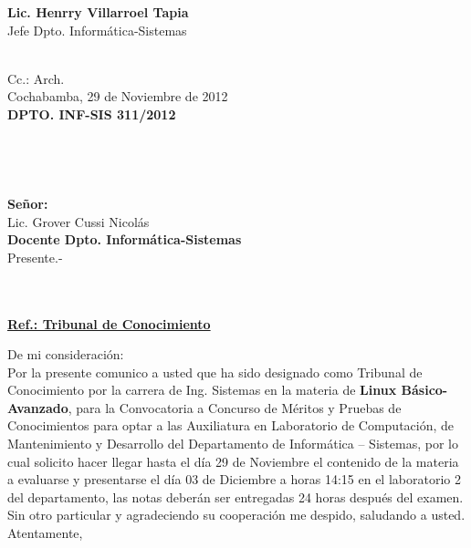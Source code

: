 \documentclass[letterpaper,11pt]{letter}
\begin{document}
\vspace{3.5cm}
\begin{center}
\begin{minipage}[b]{0.5\textwidth}
\begin{center}
{\bf Lic. Henrry Villarroel Tapia}\\
Jefe Dpto. Informática-Sistemas\\
\end{center}
\end{minipage}
\end{center}
~\\
Cc.: Arch.\\
\newpage
Cochabamba, 29 de Noviembre de 2012~\\
 \textbf{DPTO. INF-SIS 311/2012}\\
~\\
~\\
~\\
~\\
 \textbf{Señor:}~\\
Lic. Grover Cussi Nicolás~\\
 \textbf{Docente Dpto. Informática-Sistemas}~\\
Presente.-\\
~\\
~\\
\begin{center}
\underline{ \textbf{Ref.: Tribunal de Conocimiento}}
\end{center}
De mi consideración:\\
Por la presente comunico a usted que ha sido designado como Tribunal de Conocimiento por la carrera de Ing. Sistemas en la materia de \textbf{Linux Básico-Avanzado}, para la Convocatoria a Concurso de Méritos y Pruebas de Conocimientos para optar a las Auxiliatura en Laboratorio de Computación, de Mantenimiento y Desarrollo del Departamento de Informática – Sistemas, por lo cual solicito hacer llegar hasta el día 29 de Noviembre el contenido de la materia a evaluarse y presentarse el día 03 de Diciembre a horas 14:15 en el laboratorio 2 del departamento, las notas deberán ser entregadas 24 horas después del examen.\\
Sin otro particular y agradeciendo su cooperación me despido, saludando a usted.\\
Atentamente,\\
\end{document}
